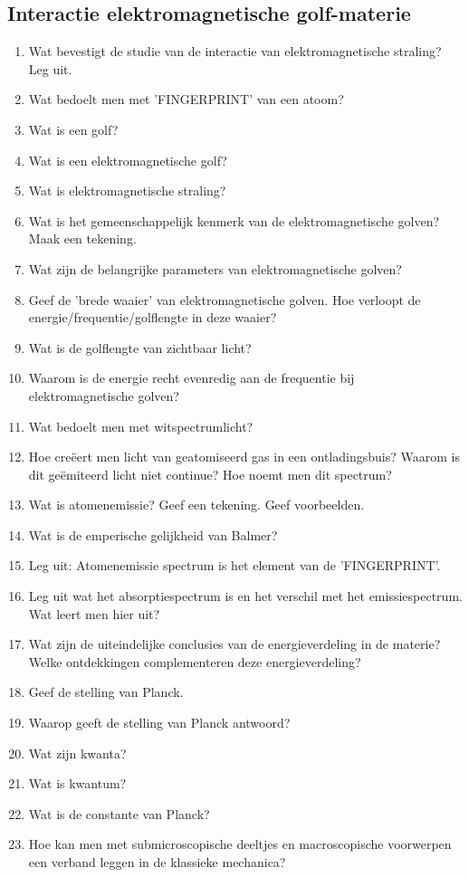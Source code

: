 \documentclass[a4paper,12pt]{article}
\begin{document}
    \subsection{Interactie elektromagnetische golf-materie}
    \begin{enumerate}
        \item Wat bevestigt de studie van de interactie van elektromagnetische straling? Leg uit.
        \item Wat bedoelt men met 'FINGERPRINT' van een atoom?
        \item Wat is een golf?
        \item Wat is een elektromagnetische golf?
        \item Wat is elektromagnetische straling?
        \item Wat is het gemeenschappelijk kenmerk van de elektromagnetische golven? Maak een tekening.
        \item Wat zijn de belangrijke parameters van elektromagnetische golven?
        \item Geef de 'brede waaier' van elektromagnetische golven. Hoe verloopt de energie/frequentie/golflengte in deze waaier?
        \item Wat is de golflengte van zichtbaar licht?
        \item Waarom is de energie recht evenredig aan de frequentie bij elektromagnetische golven?
        \item Wat bedoelt men met witspectrumlicht?
        \item Hoe creëert men licht van geatomiseerd gas in een ontladingsbuis? Waarom is dit geëmiteerd licht niet continue? Hoe noemt men dit spectrum?
        \item Wat is atomenemissie? Geef een tekening. Geef voorbeelden.
        \item Wat is de emperische gelijkheid van Balmer?
        \item Leg uit: Atomenemissie spectrum is het element van de 'FINGERPRINT'.
        \item Leg uit wat het absorptiespectrum is en het verschil met het emissiespectrum. Wat leert men hier uit?
        \item Wat zijn de uiteindelijke conclusies van de energieverdeling in de materie? Welke ontdekkingen complementeren deze energieverdeling?
        \item Geef de stelling van Planck.
        \item Waarop geeft de stelling van Planck antwoord?
        \item Wat zijn kwanta?
        \item Wat is kwantum?
        \item Wat is de constante van Planck?
        \item Hoe kan men met submicroscopische deeltjes en macroscopische voorwerpen een verband leggen in de klassieke mechanica?
    \end{enumerate}
\end{document}
